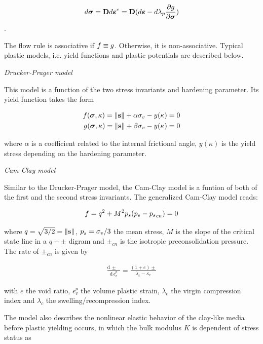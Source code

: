 \begin{eqnarray}
d\bm \sigma
= {\mathbf D} d\boldsymbol{\varepsilon}^e=
{\mathbf D} (d\boldsymbol{\varepsilon}-d \lambda_p \frac{\partial g}{\partial \bm \sigma})
\label{eq:constitu_m}
\end{eqnarray}.

The flow rule is associative if $f\equiv g$. Otherwise, it is non-associative. Typical plastic models, i.e. yield  functions and plastic potentials are described below.

\textit{Drucker-Prager model}

This model is a function of the two stress invariants and hardening parameter. Its yield function takes the form

\begin{eqnarray}
f (\bm \sigma, \kappa) =\left\Vert{\mathbf{s}} \right\Vert+\alpha\sigma_{v}-y(\kappa)=0 \\
g (\bm \sigma, \kappa) =\left\Vert{\mathbf{s}} \right\Vert+\beta \sigma_{v}-y(\kappa)=0
\label{eqn:dp}
\end{eqnarray}

where $\alpha$ is a coefficient related to the internal frictional angle, $y(\kappa)$ is the yield stress depending on the hardening parameter.

\textit{Cam-Clay model}

Similar to the Drucker-Prager model, the Cam-Clay model is a funtion of both of the first and the second stress invariants. The generalized Cam-Clay model reads:

\begin{eqnarray}
f=q^2+M^2{p_s}({p_s}-{p_s}_{cn})=0
\label{eqn:cc}
\end{eqnarray}

where $q=\sqrt{3/2}=\left\Vert {\mathbf{s}} \right\Vert$, ${p_s}=\sigma_{v}/3$ the mean stress, $M$ is the slope of the critical state line in a $q-\pm$ digram and $\pm_{cn}$ is the isotropic preconsolidation pressure. The rate of $\pm_{cn}$ is given by

\begin{eqnarray}
{\frac{\mathrm d\, \pm\phantom{^-_-}}{\mathrm d\,  \epsilon^p_v}}=\frac{(1+e)\pm}{\lambda_c-\kappa_c}
\label{eqn:cc_pcn}
\end{eqnarray}

with $e$ the void ratio, $\epsilon^p_v$ the volume plastic strain, $\lambda_c$ the virgin compression index and $\lambda_c$  the swelling/recompression index.

The model also describes the nonlinear elastic behavior of the clay-like media before plastic yielding occurs, in which the bulk modulus $K$ is dependent of stress status as

